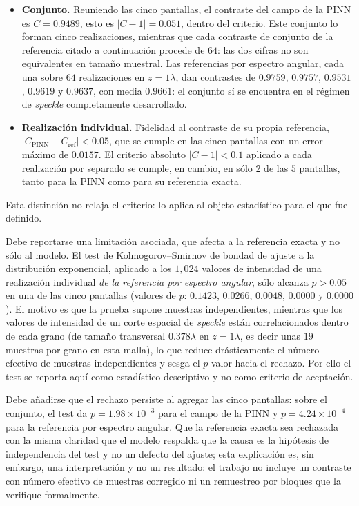 \begin{itemize}
    \item \textbf{Conjunto.} Reuniendo las cinco pantallas, el contraste del
    campo de la PINN es $C=0.9489$, esto es $|C-1|=0.051$, dentro del criterio.
    Este conjunto lo forman cinco realizaciones, mientras que cada contraste de
    conjunto de la referencia citado a continuación procede de $64$: las dos
    cifras no son equivalentes en tamaño muestral.
    Las referencias por espectro angular, cada una sobre $64$ realizaciones en
    $z=1\lambda$, dan contrastes de $0.9759$, $0.9757$, $0.9531$,
    $0.9619$ y $0.9637$, con media $0.9661$: el conjunto sí se encuentra en el
    régimen de \textit{speckle} completamente desarrollado.
    \item \textbf{Realización individual.} Fidelidad al contraste de su propia
    referencia, $|C_\text{PINN}-C_\text{ref}|<0.05$, que se cumple en las cinco
    pantallas con un error máximo de $0.0157$. El criterio absoluto
    $|C-1|<0.1$ aplicado a cada realización por separado se cumple, en cambio,
    en sólo $2$ de las $5$ pantallas, tanto para la PINN como para su
    referencia exacta.
\end{itemize}

Esta distinción no relaja el criterio: lo aplica al objeto estadístico para el
que fue definido.

Debe reportarse una limitación asociada, que afecta a la referencia exacta y
no sólo al modelo. El test de Kolmogorov--Smirnov de bondad de ajuste a la
distribución exponencial, aplicado a los $1{,}024$ valores de intensidad de una
realización individual \emph{de la referencia por espectro angular}, sólo
alcanza $p>0.05$ en una de las cinco pantallas (valores de $p$: $0.1423$, $0.0266$, $0.0048$, $0.0000$ y
$0.0000$). El motivo es que la prueba supone muestras independientes, mientras
que los valores de intensidad de un corte espacial de \textit{speckle} están
correlacionados dentro de cada grano (de tamaño transversal $0.378\lambda$ en
$z=1\lambda$, es decir unas $19$ muestras por grano en esta malla), lo
que reduce drásticamente el número efectivo de muestras independientes y sesga
el $p$-valor hacia el rechazo. Por ello el test se reporta aquí como estadístico
descriptivo y no como criterio de aceptación.

Debe añadirse que el rechazo persiste al agregar las cinco pantallas: sobre el
conjunto, el test da $p=1.98\times10^{-3}$ para el campo de la PINN y
$p=4.24\times10^{-4}$ para la referencia por espectro angular. Que la
referencia exacta sea rechazada con la misma claridad que el modelo respalda
que la causa es la hipótesis de independencia del test y no un defecto del
ajuste; esta explicación es, sin embargo, una interpretación y no un resultado:
el trabajo no incluye un contraste con número efectivo de muestras corregido ni
un remuestreo por bloques que la verifique formalmente.

